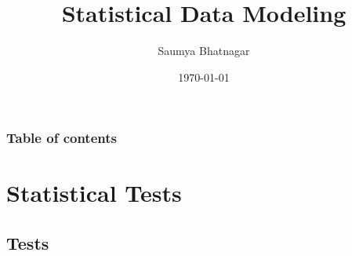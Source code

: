 \documentclass{beamer}
\begin{document}
	\title{Statistical Data Modeling}  
	\author{Saumya Bhatnagar}
	\date{\today} 
	
	
\begin{frame}
\titlepage
\end{frame}

\begin{frame}\frametitle{Table of contents}\tableofcontents
\end{frame} 


\section{Statistical Tests}


\subsection{Tests}
\end{document}

